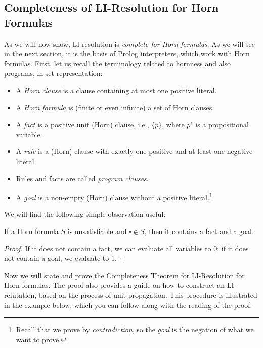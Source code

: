 \subsection{Completeness of LI-Resolution for Horn Formulas}

As we will now show, LI-resolution is \emph{complete for Horn formulas}. As we will see in the next section, it is the basis of Prolog interpreters, which work with Horn formulas. First, let us recall the terminology related to hornness and also programs, in set representation:

\begin{itemize}
    \item A \emph{Horn clause} is a clause containing at most one positive literal.
    \item A \emph{Horn formula} is (finite or even infinite) a set of Horn clauses.
    \item A \emph{fact} is a positive unit (Horn) clause, i.e., $\{p\}$, where $p`$ is a propositional variable.
    \item A \emph{rule} is a (Horn) clause with exactly one positive and at least one negative literal.
    \item Rules and facts are called \emph{program clauses}.
    \item A \emph{goal} is a non-empty (Horn) clause without a positive literal.\footnote{Recall that we prove by \emph{contradiction}, so the \emph{goal} is the negation of what we want to prove.}
\end{itemize}

We will find the following simple observation useful:

\begin{observation}\label{observation:horn-fact-goal}
    If a Horn formula $S$ is unsatisfiable and $\square\notin S$, then it contains a fact and a goal.
\end{observation}
\begin{proof}
    If it does not contain a fact, we can evaluate all variables to 0; if it does not contain a goal, we evaluate to 1.
\end{proof}

Now we will state and prove the Completeness Theorem for LI-Resolution for Horn formulas. The proof also provides a guide on how to construct an LI-refutation, based on the process of unit propagation. This procedure is illustrated in the example below, which you can follow along with the reading of the proof.

